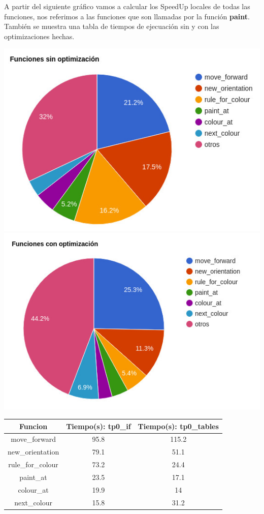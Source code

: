 \documentclass[a4paper, 10pt, twoside, notitlepage]{article}
\begin{document}
\newpage
A partir del siguiente gráfico vamos a calcular los SpeedUp locales de todas las funciones, nos referimos a las funciones que son llamadas por la función \textbf{paint}. También se muestra una tabla de tiempos de ejecuación sin y con las optimizaciones hechas.

\includegraphics[scale=3]{chart.jpg} \\

\includegraphics[scale=3]{chart2.jpg} \\

\begin{tabular}{|c|c|c|}
\hline 
Funcion & Tiempo(s): tp0\_if & Tiempo(s): tp0\_tables \\ 
\hline 
move\_forward & 95.8 & 115.2 \\ 
\hline 
new\_orientation & 79.1 & 51.1 \\ 
\hline 
rule\_for\_colour & 73.2 & 24.4 \\ 
\hline 
paint\_at & 23.5 & 17.1 \\ 
\hline 
colour\_at & 19.9 & 14 \\ 
\hline 
next\_colour & 15.8 & 31.2 \\ 
\hline 
\end{tabular} \\
 
\end{document}
